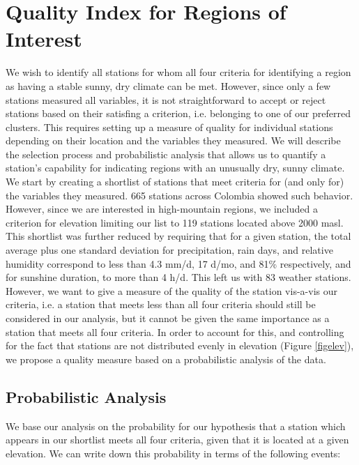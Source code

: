 \documentclass[12pt]{iopart}
\begin{document}
\section{Quality Index for Regions of Interest}

We wish to identify all stations for whom all four criteria for identifying a region as having a stable sunny, dry climate can be met.  However, since only a few stations measured all variables, it is not straightforward to accept or reject stations based on their satisfing a criterion, i.e. belonging to one of our preferred clusters. This requires setting up a measure of quality for individual stations depending on their location and the variables they measured. We will describe the selection process and probabilistic analysis that allows us to quantify a station's capability for indicating regions with an unusually dry, sunny climate.\\

We start by creating a shortlist of stations that meet criteria for (and only for) the variables they measured. 665 stations across Colombia showed such behavior. However, since we are interested in high-mountain regions, we included a criterion for elevation limiting our list to 119 stations located above 2000 masl. This shortlist was further reduced by requiring that for a given station, the total average plus one  standard deviation for precipitation, rain days, and relative humidity correspond to less than 4.3 mm/d, 17 d/mo, and 81\% respectively, and for sunshine duration, to more than 4 h/d. This left us with 83 weather stations. \\

However, we want to give a measure of the quality of the station vis-a-vis our criteria, i.e. a station that meets less than all four criteria should still be considered in our analysis, but it cannot be given the same importance as a station that meets all four criteria. In order to account for this, and controlling for the fact that stations are not distributed evenly in elevation (Figure \ref{figelev}), we propose a quality measure based on a probabilistic analysis of the data.

\subsection{Probabilistic Analysis}

We base our analysis on the probability for our hypothesis that a station which appears in our shortlist meets all four criteria, given that it is located at a given elevation. We can write down this probability in terms of the following events:
\end{document}
